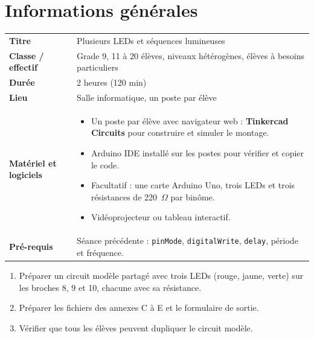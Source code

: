 \documentclass[11pt,a4paper]{article}
\begin{document}

\section{Informations générales}
\begin{tabularx}{\linewidth}{>{\bfseries}p{3.6cm}Y}
\toprule
Titre & Plusieurs LEDs et séquences lumineuses\\
Classe / effectif & Grade 9, 11 à 20 élèves, niveaux hétérogènes, élèves à besoins particuliers\\
Durée & 2 heures (120 min)\\
Lieu & Salle informatique, un poste par élève\\
Matériel et logiciels &
\begin{itemize}
 \item Un poste par élève avec navigateur web : \textbf{Tinkercad Circuits} pour construire et simuler le montage.
 \item Arduino IDE installé sur les postes pour vérifier et copier le code.
 \item Facultatif : une carte Arduino Uno, trois LEDs et trois résistances de 220~$\Omega$ par binôme.
 \item Vidéoprojecteur ou tableau interactif.
\end{itemize}\\
Pré-requis &
Séance précédente : \texttt{pinMode}, \texttt{digitalWrite}, \texttt{delay}, période et fréquence.\\
\bottomrule
\end{tabularx}

\begin{astuce}
\begin{enumerate}
 \item Préparer un circuit modèle partagé avec trois LEDs (rouge, jaune, verte) sur les broches 8, 9 et 10, chacune avec sa résistance.
 \item Préparer les fichiers des annexes C à E et le formulaire de sortie.
 \item Vérifier que tous les élèves peuvent dupliquer le circuit modèle.
\end{enumerate}
\end{astuce}

\end{document}
